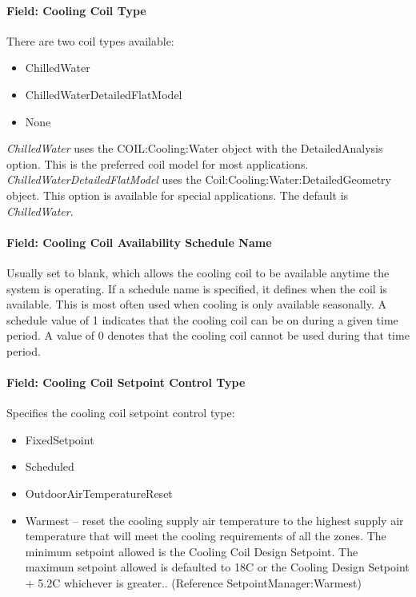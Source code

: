 \paragraph{Field: Cooling Coil Type}\label{field-cooling-coil-type-11}

There are two coil types available:

\begin{itemize}
\item
  ChilledWater
\item
  ChilledWaterDetailedFlatModel
\item
  None
\end{itemize}

\emph{ChilledWater} uses the COIL:Cooling:Water object with the DetailedAnalysis option. This is the preferred coil model for most applications. \emph{ChilledWaterDetailedFlatModel} uses the Coil:Cooling:Water:DetailedGeometry object. This option is available for special applications. The default is \emph{ChilledWater}.

\paragraph{Field: Cooling Coil Availability Schedule Name}\label{field-cooling-coil-availability-schedule-name-10}

Usually set to blank, which allows the cooling coil to be available anytime the system is operating. If a schedule name is specified, it defines when the coil is available. This is most often used when cooling is only available seasonally. A schedule value of 1 indicates that the cooling coil can be on during a given time period. A value of 0 denotes that the cooling coil cannot be used during that time period.

\paragraph{Field: Cooling Coil Setpoint Control Type}\label{field-cooling-coil-setpoint-control-type-1}

Specifies the cooling coil setpoint control type:

\begin{itemize}
\item
  FixedSetpoint
\item
  Scheduled
\item
  OutdoorAirTemperatureReset
\item
  Warmest -- reset the cooling supply air temperature to the highest supply air temperature that will meet the cooling requirements of all the zones. The minimum setpoint allowed is the Cooling Coil Design Setpoint. The maximum setpoint allowed is defaulted to 18C or the Cooling Design Setpoint + 5.2C whichever is greater.. (Reference SetpointManager:Warmest)
\end{itemize}

